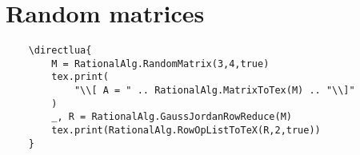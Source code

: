 \documentclass[11pt]{article}
\begin{document}
\pagebreak
\section*{Random matrices}

\begin{lstlisting}
    \directlua{
        M = RationalAlg.RandomMatrix(3,4,true) 
        tex.print(
            "\\[ A = " .. RationalAlg.MatrixToTex(M) .. "\\]"
        )
        _, R = RationalAlg.GaussJordanRowReduce(M)
        tex.print(RationalAlg.RowOpListToTeX(R,2,true))
    }
\end{lstlisting}

\end{document}
